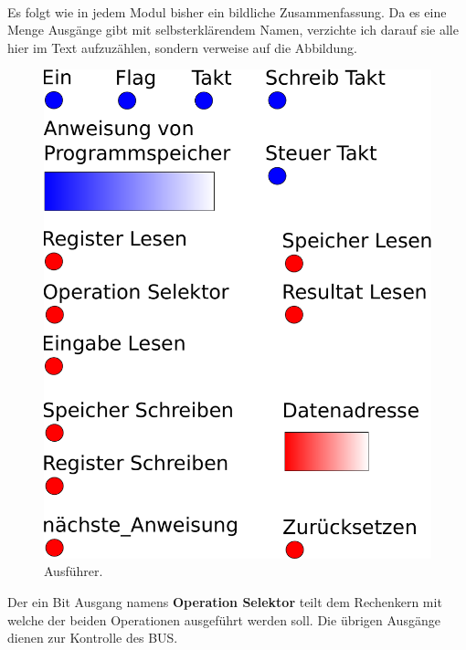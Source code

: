 \documentclass[11pt,a4paper,leqno]{report}
\numberwithin{equation}{chapter}
\begin{document}
\\
Es folgt wie in jedem Modul bisher ein bildliche Zusammenfassung. Da es eine Menge Ausg\"ange gibt mit selbsterkl\"arendem Namen, verzichte ich darauf sie alle hier im Text aufzuz\"ahlen, sondern verweise auf die Abbildung.
\begin{figure}[H]
	\begin{center}
		\includegraphics[scale=0.265]{Ausfuehrer.pdf}
		\caption{Ausf\"uhrer.}
	\end{center}
\end{figure}
\noindent
Der ein Bit Ausgang namens \textbf{Operation Selektor} teilt dem Rechenkern mit welche der beiden Operationen ausgef\"uhrt werden soll. Die \"ubrigen Ausg\"ange dienen zur Kontrolle des BUS.
\end{document}
